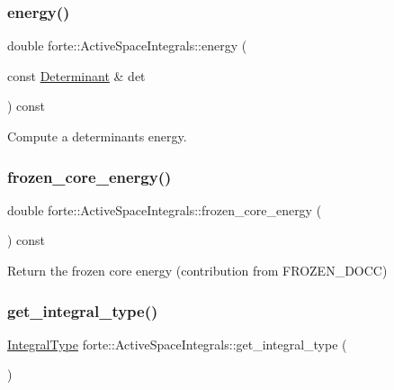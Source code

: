 \subsubsection{\texorpdfstring{energy()}{energy()}}
{\footnotesize\ttfamily double forte\+::\+Active\+Space\+Integrals\+::energy (\begin{DoxyParamCaption}\item[{const \mbox{\hyperlink{namespaceforte_a2076c63fd7b8732004d9e1442ce527c1}{Determinant}} \&}]{det }\end{DoxyParamCaption}) const}



Compute a determinant\textquotesingle{}s energy. 

\mbox{\label{classforte_1_1_active_space_integrals_a8481b2cb3f2bc4b44984da170724cb72}} 
\subsubsection{\texorpdfstring{frozen\+\_\+core\+\_\+energy()}{frozen\_core\_energy()}}
{\footnotesize\ttfamily double forte\+::\+Active\+Space\+Integrals\+::frozen\+\_\+core\+\_\+energy (\begin{DoxyParamCaption}{ }\end{DoxyParamCaption}) const\hspace{0.3cm}{\ttfamily [inline]}}



Return the frozen core energy (contribution from F\+R\+O\+Z\+E\+N\+\_\+\+D\+O\+CC) 

\mbox{\label{classforte_1_1_active_space_integrals_aae0f53c04ea99da9626ed9908ea82900}} 
\subsubsection{\texorpdfstring{get\+\_\+integral\+\_\+type()}{get\_integral\_type()}}
{\footnotesize\ttfamily \mbox{\hyperlink{namespaceforte_a790e7e85ac0911c4c9494622496d95e6}{Integral\+Type}} forte\+::\+Active\+Space\+Integrals\+::get\+\_\+integral\+\_\+type (\begin{DoxyParamCaption}{ }\end{DoxyParamCaption})\hspace{0.3cm}{\ttfamily [inline]}}

